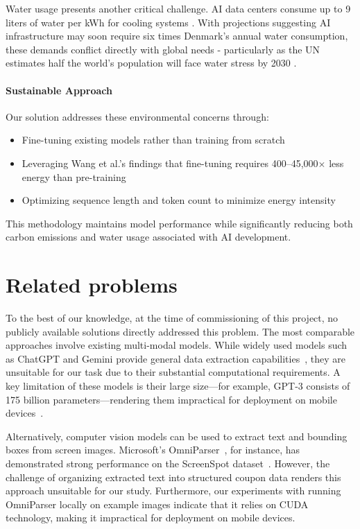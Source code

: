 \documentclass[licencjacka,en]{pracamgr}
\begin{document}
Water usage presents another critical challenge. AI data centers consume up to 9 liters of water per kWh for cooling systems \cite{first}. With projections suggesting AI infrastructure may soon require six times Denmark's annual water consumption, these demands conflict directly with global needs - particularly as the UN estimates half the world's population will face water stress by 2030 \cite{water_scarcity}.

\subsubsection{Sustainable Approach}
Our solution addresses these environmental concerns through:
\begin{itemize}
    \item Fine-tuning existing models rather than training from scratch
    \item Leveraging Wang et al.'s findings that fine-tuning requires 400--45,000$\times$ less energy than pre-training \cite{finetuning_env_good}
    \item Optimizing sequence length and token count to minimize energy intensity
\end{itemize}

This methodology maintains model performance while significantly reducing both carbon emissions and water usage associated with AI development.


\chapter{Related problems}
To the best of our knowledge, at the time of commissioning of this project, no publicly available solutions directly addressed this problem. The most comparable approaches involve existing multi-modal models. While widely used models such as ChatGPT and Gemini provide general data extraction capabilities~\cite{brinkmann2023}, they are unsuitable for our task due to their substantial computational requirements. A key limitation of these models is their large size—for example, GPT-3 consists of 175 billion parameters\cite{chatgpt_params}—rendering them impractical for deployment on mobile devices~\cite{LinguaLinked}.

Alternatively, computer vision models can be used to extract text and bounding boxes from screen images. Microsoft’s OmniParser~\cite{omniparser_intro}, for instance, has demonstrated strong performance on the ScreenSpot dataset~\cite{omniparser_intro, cheng2024}. However, the challenge of organizing extracted text into structured coupon data renders this approach unsuitable for our study. Furthermore, our experiments with running OmniParser locally on example images indicate that it relies on CUDA technology, making it impractical for deployment on mobile devices.
\end{document}
